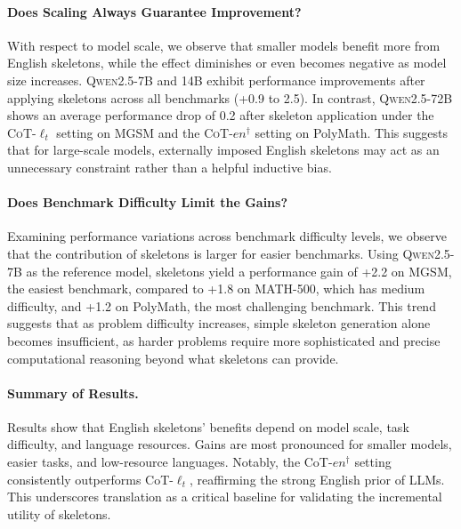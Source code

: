 \paragraph{Does Scaling Always Guarantee Improvement?}
With respect to model scale, we observe that smaller models benefit more from English skeletons, while the effect diminishes or even becomes negative as model size increases. \textsc{Qwen2.5-7B} and \textsc{14B} exhibit performance improvements after applying skeletons across all benchmarks (+0.9 to 2.5). In contrast, \textsc{Qwen2.5-72B} shows an average performance drop of 0.2 after skeleton application under the \textsc{CoT}-$\ell_t$ setting on MGSM and the \textsc{CoT}-$en^{\dagger}$ setting on PolyMath. This suggests that for large-scale models, externally imposed English skeletons may act as an unnecessary constraint rather than a helpful inductive bias.

\paragraph{Does Benchmark Difficulty Limit the Gains?}
Examining performance variations across benchmark difficulty levels, we observe that the contribution of skeletons is larger for easier benchmarks. Using \textsc{Qwen2.5-7B} as the reference model, skeletons yield a performance gain of +2.2 on MGSM, the easiest benchmark, compared to +1.8 on MATH-500, which has medium difficulty, and +1.2 on PolyMath, the most challenging benchmark. This trend suggests that as problem difficulty increases, simple skeleton generation alone becomes insufficient, as harder problems require more sophisticated and precise computational reasoning beyond what skeletons can provide.

\paragraph{Summary of Results.}
Results show that English skeletons' benefits depend on model scale, task difficulty, and language resources. Gains are most pronounced for smaller models, easier tasks, and low-resource languages. Notably, the CoT-\textsc{$en^{\dagger}$} setting consistently outperforms CoT\textsc{-$\ell_t$}, reaffirming the strong English prior of LLMs. This underscores translation as a critical baseline for validating the incremental utility of skeletons.

